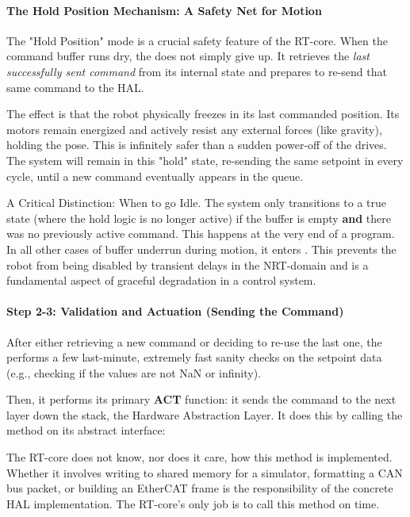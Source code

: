\paragraph{The Hold Position Mechanism: A Safety Net for Motion}
The "Hold Position" mode is a crucial safety feature of the RT-core. When the command buffer runs dry, the  does not simply give up. It retrieves the \textit{last successfully sent command} from its internal state and prepares to re-send that same command to the HAL.

The effect is that the robot physically freezes in its last commanded position. Its motors remain energized and actively resist any external forces (like gravity), holding the pose. This is infinitely safer than a sudden power-off of the drives. The system will remain in this "hold" state, re-sending the same setpoint in every cycle, until a new command eventually appears in the queue.

\begin{dangerbox}{A Critical Distinction: When to go Idle.}
    The system only transitions to a true  state (where the hold logic is no longer active) if the buffer is empty \textbf{and} there was no previously active command. This happens at the very end of a program. In all other cases of buffer underrun during motion, it enters . This prevents the robot from being disabled by transient delays in the NRT-domain and is a fundamental aspect of graceful degradation in a control system.
\end{dangerbox}

\paragraph{Step 2-3: Validation and Actuation (Sending the Command)}
After either retrieving a new command or deciding to re-use the last one, the  performs a few last-minute, extremely fast sanity checks on the setpoint data (e.g., checking if the values are not NaN or infinity).

Then, it performs its primary \textbf{ACT} function: it sends the command to the next layer down the stack, the Hardware Abstraction Layer. It does this by calling the method on its abstract interface:

The RT-core does not know, nor does it care, how this method is implemented. Whether it involves writing to shared memory for a simulator, formatting a CAN bus packet, or building an EtherCAT frame is the responsibility of the concrete HAL implementation. The RT-core's only job is to call this method on time.

